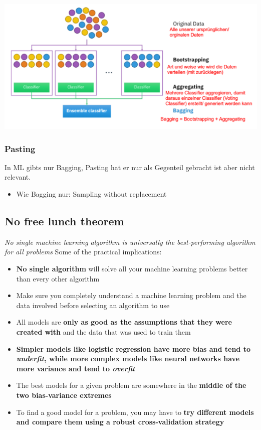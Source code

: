 \includegraphics[width=\linewidth]{./img/bagging.png}

\subsubsection{Pasting}
In ML gibts nur Bagging, Pasting hat er nur als Gegenteil gebracht ist aber nicht relevant.
\begin{itemize}
    \item Wie Bagging nur: Sampling without replacement
\end{itemize}

\subsection{No free lunch theorem}
\textit{No single machine learning algorithm is universally the best-performing algorithm for all problems}
Some of the practical implications:
\begin{itemize}
    \item \textbf{No single algorithm} will solve all your machine learning problems better than every other algorithm
    \item Make sure you completely understand a machine learning problem and the data involved before selecting an algorithm to use
    \item All models are \textbf{only as good as the assumptions that they were created with} and the data that was used to train them
    \item \textbf{Simpler models like logistic regression have more bias and tend to \textit{underfit}, while more complex models like neural networks have more variance and tend to \textit{overfit}}
    \item The best models for a given problem are somewhere in the \textbf{middle of the two bias-variance extremes}
    \item To find a good model for a problem, you may have to \textbf{try different models and compare them using a robust cross-validation strategy}
\end{itemize}

